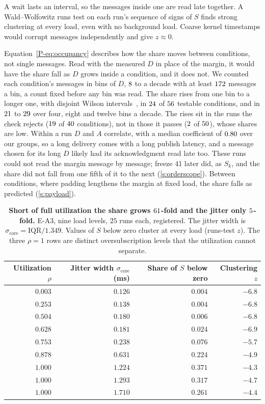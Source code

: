 \documentclass[10pt,journal,onecolumn]{IEEEtran}
\begin{document}
A wait lasts an interval, so the messages inside one are read late together. A Wald--Wolfowitz
runs test on each run's sequence of signs of $S$ finds strong clustering at every load, even with
no background load. Coarse kernel timestamps would corrupt messages independently and give
$z\approx0$.

Equation~\ref{P-eq:occupancy} describes how the share moves between conditions, not single
messages. Read with the measured $D$ in place of the margin, it would have the share fall as $D$
grows inside a condition, and it does not. We counted each condition's messages in bins of $D$,
$8$ to a decade with at least $172$ messages a bin, a count fixed before
any bin was read. The share rises from one bin to a longer one, with disjoint Wilson
intervals~\cite{wilson1927probable}, in $24$ of $56$ testable conditions, and in
$21$ to $29$ over four, eight and twelve bins a decade. The rises sit in the
runs the check rejects ($19$ of $40$ conditions), not in those it
passes ($2$ of $50$), whose shares are low. Within a run $D$ and $A$
correlate, with a median coefficient of $0.80$ over our groups, so a long delivery
comes with a long publish latency, and a message chosen for its long $D$ likely had its
acknowledgment read late too. These runs could not read the margin message by message; freeze 41 later did, as $S_k$, and
the share did not fall from one fifth of it to the next (\ref{s:orderscope}). Between
conditions, where padding lengthens the margin at fixed load, the share falls as predicted
(\ref{s:payload}).

\begin{table}[tb]
\caption{\textbf{Short of full utilization the share grows $61$-fold and the jitter only
$5$-fold.} E-A3, nine load levels, $25$ runs each, registered. The jitter width is
$\sigma_{\mathrm{core}} = \mathrm{IQR}/1.349$. Values of $S$ below zero cluster at every load
(runs-test $z$). The three $\rho=1$ rows are distinct oversubscription levels that the utilization
cannot separate.}
\label{stab:mixture}
\centering
\footnotesize
\begin{tabular}{@{}rrrr@{}}
\toprule
Utilization $\rho$ & Jitter width $\sigma_{\mathrm{core}}$ (ms) & Share of $S$ below zero & Clustering $z$ \\
\midrule
$0.003$ & $0.126$ & $0.004$ & $-6.8$ \\
$0.253$ & $0.138$ & $0.004$ & $-6.8$ \\
$0.504$ & $0.180$ & $0.006$ & $-6.8$ \\
$0.628$ & $0.181$ & $0.024$ & $-6.9$ \\
$0.753$ & $0.238$ & $0.076$ & $-5.7$ \\
$0.878$ & $0.631$ & $0.224$ & $-4.9$ \\
$1.000$ & $1.224$ & $0.371$ & $-4.3$ \\
$1.000$ & $1.293$ & $0.317$ & $-4.7$ \\
$1.000$ & $1.710$ & $0.261$ & $-4.4$ \\
\bottomrule
\end{tabular}
\end{table}
\end{document}
